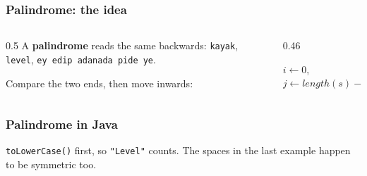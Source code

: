 \documentclass[aspectratio=169,10pt,compress]{beamer}
\begin{document}
\begin{frame}[t,fragile] \frametitle{Palindrome: the idea}
  \begin{columns}[T]
    \begin{column}{0.5\textwidth}
      \small A \textbf{palindrome} reads the same backwards: \texttt{kayak}, \texttt{level},
      \texttt{ey edip adanada pide ye}.

      \vspace{0.4em}
      Compare the two ends, then move inwards:
      \begin{center}
      \end{center}
    \end{column}
    \begin{column}{0.46\textwidth}
      \SetAlFnt{\small}


\begin{algorithm}[H]
  \caption{IsPalindrome($s$)}
  $i \leftarrow 0$, \quad $j \leftarrow \mathit{length}(s) - 1$\;
  \;
\end{algorithm}


    \end{column}
  \end{columns}
\end{frame}




\begin{frame}[t,fragile] \frametitle{Palindrome in Java}

  \vspace{0.3em}
  \small \texttt{toLowerCase()} first, so \texttt{"Level"} counts. The spaces in the last example happen to be symmetric too.
\end{frame}
\end{document}
